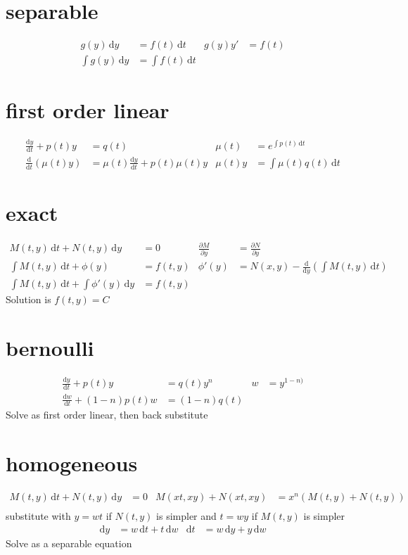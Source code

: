 \documentclass{article}
\begin{document}
\section*{separable}
\begin{align*}
g(y)\,\mathrm{d}y&=f(t)\,\mathrm{d}t & g(y)y'&=f(t)\\
\int{g(y)\,\mathrm{d}y}&=\int{f(t)\,\mathrm{d}t}
\end{align*}
\section*{first order linear}
\begin{align*}
\frac{\mathrm{d}y}{\mathrm{d}t}+p(t)y&=q(t) & \mu(t)&=e^{\int{p(t)\,\mathrm{d}t}}\\
\frac{\mathrm{d}}{\mathrm{d}t}\left(\mu(t)y\right)&=\mu(t)\frac{\mathrm{d}y}{\mathrm{d}t}+p(t)\mu(t)y & \mu(t)y&=\int{\mu(t)q(t)\,\mathrm{d}t}
\end{align*}
\section*{exact}
\begin{align*}
M(t,y)\,\mathrm{d}t+N(t,y)\,\mathrm{d}y&=0 & \frac{\partial M}{\partial y}&=\frac{\partial N}{\partial y}\\
\int{M(t,y)\,\mathrm{d}t}+\phi(y)&=f(t,y) & \phi'(y)&=N(x,y)-\frac{\mathrm{d}}{\mathrm{d}y}\left(\int{M(t,y)\,\mathrm{d}t}\right)\\
\int{M(t,y)\,\mathrm{d}t}+\int{\phi'(y)\,\mathrm{d}y}&=f(t,y)
\end{align*}
Solution is $f(t,y)=C$
\section*{bernoulli}
\begin{align*}
\frac{\mathrm{d}y}{\mathrm{d}t}+p(t)y&=q(t)y^n & w&=y^{1-n)}\\
\frac{\mathrm{d}w}{\mathrm{d}t}+(1-n)p(t)w&=(1-n)q(t)
\end{align*}
Solve as first order linear, then back substitute
\section*{homogeneous}
\begin{align*}
M(t,y)\,\mathrm{d}t+N(t,y)\,\mathrm{d}y&=0 & M(xt,xy)+N(xt,xy)&=x^n\left(M(t,y)+N(t,y)\right)\\
\end{align*}
substitute with $y=wt$ if $N(t,y)$ is simpler and $t=wy$ if $M(t,y)$ is simpler
\begin{align*}
\mathrm{d}y&=w\,\mathrm{d}t+t\,\mathrm{d}w &\mathrm{d}t&=w\,\mathrm{d}y+y\,\mathrm{d}w
\end{align*}
Solve as a separable equation
\end{document}
